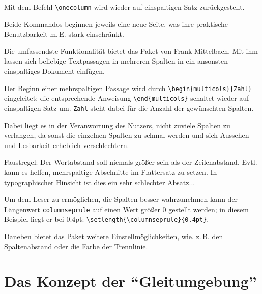 Mit dem Befehl \lstinline/\onecolumn/ wird wieder auf einspaltigen Satz zurückgestellt.

Beide Kommandos beginnen jeweils eine neue Seite, was ihre praktische Benutzbarkeit m.\,E.
stark einschränkt.



\begin{multicols}{2}
 Die umfassendste Funktionalität bietet das Paket  von Frank Mittelbach.
 Mit ihm lassen sich beliebige Textpassagen in mehreren Spalten in ein ansonsten
 einspaltiges Dokument einfügen.
 
 Der Beginn einer mehrspaltigen Passage wird durch \lstinline/\begin{multicols}{Zahl}/ 
 eingeleitet; die entsprechende Anweisung \lstinline/\end{multicols}/ schaltet wieder
 auf einspaltigen Satz um. \lstinline/Zahl/ steht dabei für die Anzahl der gewünschten 
 Spalten.                                            
\end{multicols}

\setlength{\columnseprule}{0.4pt}
\begin{multicols}{3}
 Dabei liegt es in der Veranwortung des Nutzers, nicht zuviele Spalten zu verlangen,
 da sonst die einzelnen Spalten zu schmal werden und sich Aussehen und Lesbarkeit erheblich
 verschlechtern.
 
 Faustregel: Der Wortabstand soll niemals größer sein als der Zeilenabstand.
 Evtl. kann es helfen, mehrspaltige Abschnitte im Flattersatz zu setzen.
 In typographischer Hinsicht ist dies ein sehr schlechter Absatz...
 
 Um dem Leser zu ermöglichen, die Spalten besser wahrzunehmen kann der Längenwert 
 \lstinline/columnseprule/ auf einen Wert größer 0 gestellt werden;
 in diesem Beispiel liegt er bei 0.4pt: \lstinline/\setlength{\columnseprule}{0.4pt}/.
 
 Daneben bietet das Paket weitere Einstellmöglichkeiten, wie. z.\,B. den Spaltenabstand
 oder die Farbe der Trennlinie.
\end{multicols}



\section{Das Konzept der \enquote{Gleitumgebung}}

